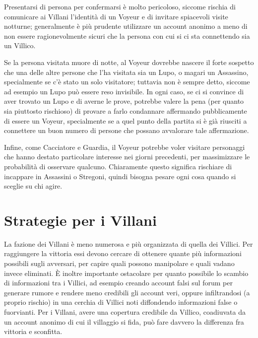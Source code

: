 \documentclass[a4paper,10pt]{article}
\begin{document}
\begin{itemize}
	Presentarsi di persona per confermarsi è molto pericoloso, siccome rischia di comunicare ai Villani l'identità di un Voyeur e di invitare spiacevoli visite notturne; generalmente è più prudente utilizzare un account anonimo a meno di non essere ragionevolmente sicuri che la persona con cui si ci sta connettendo sia un Villico. 

    Se la persona visitata muore di notte, al Voyeur dovrebbe nascere il forte sospetto che una delle altre persone che l'ha visitata sia un Lupo, o magari un Assassino, specialmente se c'è stato un solo visitatore; tuttavia non è sempre detto, siccome ad esempio un Lupo può essere reso invisibile. In ogni caso, se ci si convince di aver trovato un Lupo e di averne le prove, potrebbe valere la pena (per quanto sia piuttosto rischioso) di provare a farlo condannare affermando pubblicamente di essere un Voyeur, specialmente se a quel punto della partita si è già riusciti a connettere un buon numero di persone che possano avvalorare tale affermazione.


    Infine, come Cacciatore e Guardia, il Voyeur potrebbe voler visitare personaggi che hanno destato particolare interesse nei giorni precedenti, per massimizzare le probabilità di osservare qualcuno. Chiaramente questo significa rischiare di incappare in Assassini o Stregoni, quindi bisogna pesare ogni cosa quando si sceglie su chi agire.
\end{itemize}

\section{Strategie per i Villani}

    La fazione dei Villani è meno numerosa e più organizzata di quella dei Villici. Per raggiungere la vittoria essi devono cercare di ottenere quante più informazioni possibili sugli avversari, per capire quali possono manipolare e quali vadano invece eliminati. È inoltre importante ostacolare per quanto possibile lo scambio di informazioni tra i Villici, ad esempio creando account falsi sul forum per generare rumore e rendere meno credibili gli account veri, oppure infiltrandosi (a proprio rischio) in una cerchia di Villici noti diffondendo informazioni false o fuorvianti. Per i Villani, avere una copertura credibile da Villico, coadiuvata da un account anonimo di cui il villaggio si fida, può fare davvero la differenza fra vittoria e sconfitta.
\end{document}
